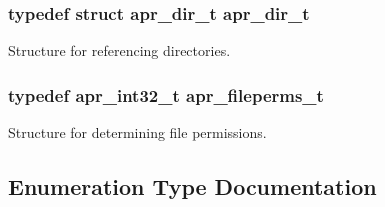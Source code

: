 \subsubsection[{\texorpdfstring{apr\+\_\+dir\+\_\+t}{apr_dir_t}}]{\setlength{\rightskip}{0pt plus 5cm}typedef struct {\bf apr\+\_\+dir\+\_\+t} {\bf apr\+\_\+dir\+\_\+t}}\hypertarget{group__apr__file__info_ga92ed8cf52cba2abb42cf74087aa74da8}{}\label{group__apr__file__info_ga92ed8cf52cba2abb42cf74087aa74da8}
Structure for referencing directories. 
\subsubsection[{\texorpdfstring{apr\+\_\+fileperms\+\_\+t}{apr_fileperms_t}}]{\setlength{\rightskip}{0pt plus 5cm}typedef {\bf apr\+\_\+int32\+\_\+t} {\bf apr\+\_\+fileperms\+\_\+t}}\hypertarget{group__apr__file__info_ga3af19c4c47007169064a70f9351bc7d8}{}\label{group__apr__file__info_ga3af19c4c47007169064a70f9351bc7d8}
Structure for determining file permissions. 

\subsection{Enumeration Type Documentation}
